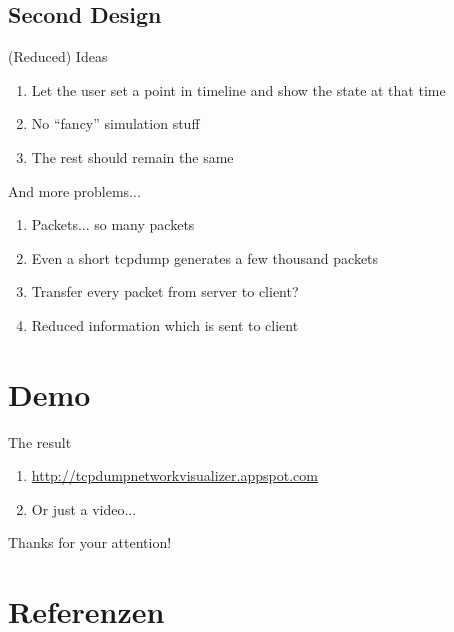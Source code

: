 \documentclass{beamer}
\begin{document}
\subsection{Second Design}

\begin{frame}{(Reduced) Ideas}
 \begin{enumerate}
  \item Let the user set a point in timeline and show the state at that time
  \item No ``fancy'' simulation stuff
  \item The rest should remain the same
 \end{enumerate}

\end{frame}


\begin{frame}{And more problems...}
 \begin{enumerate}
  \item Packets... so many packets
  \item Even a short tcpdump generates a few thousand packets
  \item Transfer every packet from server to client?
  \item Reduced information which is sent to client
 \end{enumerate}
\end{frame}

\section{Demo}

\begin{frame}{The result}
\begin{enumerate}
 \item \url{http://tcpdumpnetworkvisualizer.appspot.com}
 \item Or just a video...
\end{enumerate}
\end{frame}


\begin{frame}
  Thanks for your attention!
\end{frame}


\section{Referenzen}

\end{document}
